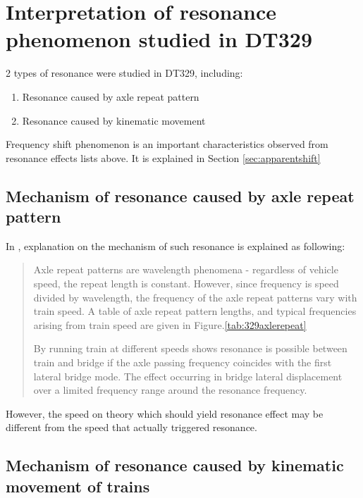 \section{Interpretation of resonance phenomenon studied in DT329}\label{sec:resonance329}

2 types of resonance were studied in DT329, including:

\begin{enumerate}
    \item Resonance caused by axle repeat pattern
    \item Resonance caused by kinematic movement
\end{enumerate}

Frequency shift phenomenon is an important characteristics observed from resonance effects lists above. It is explained in Section \ref{sec:apparentshift}

\subsection{Mechanism of resonance caused by axle repeat pattern}

In \citet[3.4.3]{d181dt329}, explanation on the mechanism of such resonance is explained as following:

\begin{quote}
    Axle repeat patterns are wavelength phenomena - regardless of vehicle speed, the repeat length is constant. However, since frequency is speed divided by wavelength, the frequency of the axle repeat patterns vary with train speed. A table of axle repeat pattern lengths, and typical frequencies arising from train speed are given in Figure.\ref{tab:329axlerepeat}

    By running train at different speeds shows resonance is possible between train and bridge if the axle passing frequency coincides with the first lateral bridge mode. The effect occurring in bridge lateral displacement over a limited frequency range around the resonance frequency.
\end{quote}



However, the speed on theory which should yield resonance effect may be different from the speed that actually triggered resonance.

\subsection{Mechanism of resonance caused by kinematic movement of trains} 

